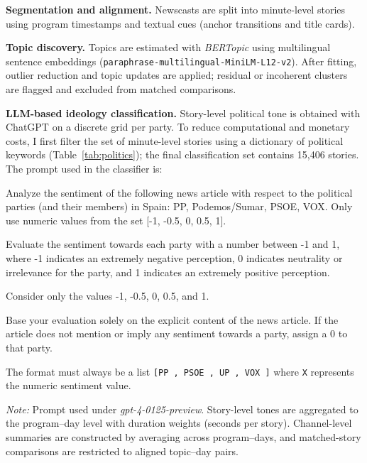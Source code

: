 \documentclass[12pt]{article}
\begin{document}
\textbf{Segmentation and alignment.} Newscasts are split into minute-level stories using program timestamps and textual cues (anchor transitions and title cards). 

\textbf{Topic discovery.} Topics are estimated with \emph{BERTopic} using multilingual sentence embeddings (\texttt{paraphrase-multilingual-MiniLM-L12-v2}). After fitting, outlier reduction and topic updates are applied; residual or incoherent clusters are flagged and excluded from matched comparisons.

\textbf{LLM-based ideology classification.} Story-level political tone is obtained with ChatGPT on a discrete grid per party. To reduce computational and monetary costs, I first filter the set of minute-level stories using a dictionary of political keywords (Table~\ref{tab:politics}); the final classification set contains 15{,}406 stories. The prompt used in the classifier is:

\begin{tcolorbox}[colback=blue!5!white, colframe=blue!75!black, title=Prompt]
	Analyze the sentiment of the following news article with respect to the political parties (and their members) in Spain: PP, Podemos/Sumar, PSOE, VOX. Only use numeric values from the set [-1, -0.5, 0, 0.5, 1].
	
	Evaluate the sentiment towards each party with a number between -1 and 1, where -1 indicates an extremely negative perception, 0 indicates neutrality or irrelevance for the party, and 1 indicates an extremely positive perception.
	
	Consider only the values -1, -0.5, 0, 0.5, and 1.
	
	Base your evaluation solely on the explicit content of the news article. If the article does not mention or imply any sentiment towards a party, assign a 0 to that party.
	
	The format must always be a list \texttt{[PP
		, PSOE
		, UP
		, VOX
		]} where \texttt{X} represents the numeric sentiment value.
\end{tcolorbox}

\noindent\textit{Note:} Prompt used under \textit{gpt-4-0125-preview}. Story-level tones are aggregated to the program–day level with duration weights (seconds per story). Channel-level summaries are constructed by averaging across program–days, and matched-story comparisons are restricted to aligned topic–day pairs.



\newpage
\end{document}
